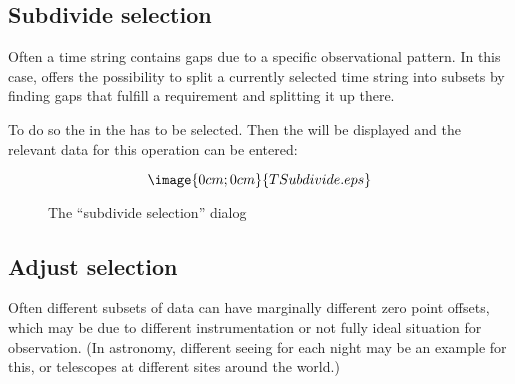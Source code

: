 \subsection{Subdivide selection}%
\label{timestring.subdivide}

Often a time string contains gaps due to a specific observational pattern.
In this case, \period offers the possibility to split a currently selected
time string into subsets by finding gaps that fulfill a requirement and 
splitting it up there.

To do so the  in the 
has to be selected. Then the 
will be displayed and the relevant data for this operation can be entered:

\begin{figure}[h]
$$\image{0cm;0cm}{TSubdivide.eps}$$%
\caption{The ``subdivide selection'' dialog}%
\label{timestring.subdivide.dialog}
\end{figure}


\subsection{Adjust selection}%
\label{timestring.adjust}
Often different subsets of data can have marginally different 
zero point offsets, which may be due to different instrumentation or
not fully ideal situation for observation. (In astronomy, different
seeing for each night may be an example for this, or telescopes 
at different sites around the world.)

